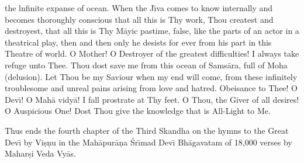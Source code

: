 the lnfinite expanse of ocean. When the J\={\i}va comes to know internally and becomes thoroughly conscious that all this is Thy work, Thou createst and destroyest, that all this is Thy M\=ayic pastime, false, like the parts of an actor in a theatrical play, then and then only he desists for ever from his part in this Theatre of world. O Mother! O Destroyer of the greatest difficulties! I always take refuge unto Thee. Thou dost save me from this ocean of Sams\=ara, full of Moha (delusion). Let Thou be my Saviour when my end will come, from these infinitely troublesome and unreal pains arising from love and hatred. Obeisance to Thee! O Dev\={\i}! O Mah\=a vidy\=a! I fall prostrate at Thy feet. O Thou, the Giver of all desires! O Auspicious One! Dost Thou give the knowledge that is All-Light to Me.

Thus ends the fourth chapter of the Third Skandha on the hymns to the Great Dev\={\i} by Vi\d{s}\d{n}u in the Mah\=apur\=a\d{n}a \'Sr\={\i}mad Dev\={\i} Bh\=agavatam of 18,000 verses by Mahar\d{s}i Veda Vy\=as.



